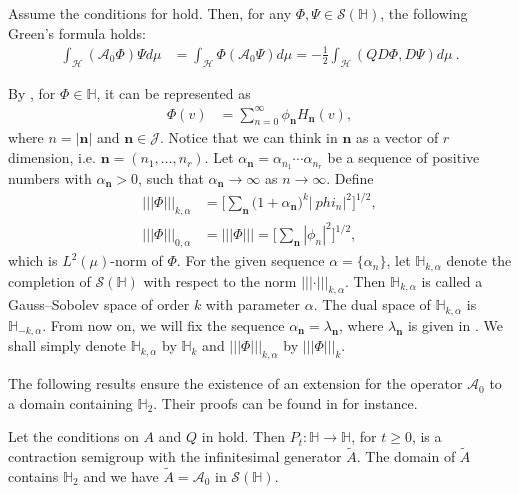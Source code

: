 \documentclass[review, onefignum, onetabnum]{siamart171218}
\begin{document}
\begin{lemma}
    Assume the conditions for   hold. Then, for any
    $\Phi,\Psi\in \mathcal{S}(\mathbb{H})$, the following Green’s formula holds:
    \begin{align}
         \int_{\mathcal{H}} (\mathcal{A}_0 \Phi)\Psi d\mu &=
             \int_{\mathcal{H}} \Phi(\mathcal{A}_0 \Psi) d\mu=
            -\frac{1}{2}\int_{\mathcal{H}} (QD\Phi, D\Psi) d\mu \ .
    \end{align}

\end{lemma}
By , for $\Phi \in \mathbb{H}$, it can be represented as
\begin{align} \label{s1.4}
    \Phi(v) &=
        \sum_{n=0}^\infty \phi_{\mathbf{n}} H_{\mathbf{n}}(v),
\end{align}
where $n = |\mathbf{n}|$ and $\mathbf{n}\in \mathcal{J}$. Notice that we can
think in $\mathbf{n}$ as a vector of $r$ dimension, i.e.
$\mathbf{n}=(n_1,\ldots,n_r)$.
Let $\alpha_{\mathbf{n}} = \alpha_{n_1}\cdots \alpha_{n_r}$ be a sequence of
positive numbers with $\alpha_{\mathbf{n}} > 0$, such that
$\alpha_{\mathbf{n}} \rightarrow \infty$ as $n \rightarrow \infty$.
Define
\begin{align*}
     |||\Phi|||_{k,\alpha} 
        &= \Bigg[ \sum_{\mathbf{n}}
        \big(
            1 + \alpha_{\mathbf{n}}
        \big) ^ k |\ phi_n |^2 \Bigg]^{1/2} ,
    \\
    |||\Phi|||_{0,\alpha} 
        &= |||\Phi|||=\Bigg[ \sum_{\mathbf{n}} |\phi_n|^2
    \Bigg]^{1/2},
\end{align*}
which is $L^2(\mu)$-norm of $\Phi$. For the given sequence
$\alpha = \{\alpha_n \}$, let $\mathbb{H}_{k,\alpha}$ denote
the completion of $\mathcal{S}(\mathbb{H})$ with respect to the norm
$|||\cdot|||_{k,\alpha}$. Then $\mathbb{H}_{k,\alpha}$ is called
a Gauss–Sobolev space of order $k$ with parameter $\alpha$. The dual space of
$\mathbb{H}_{k,\alpha}$ is $\mathbb{H}_{-k,\alpha}$.
From now on, we will fix the sequence $\alpha_{\mathbf{n}} =
\lambda_{\mathbf{n}} $, where $\lambda_{\mathbf{n}} $ is given in
.
We shall simply denote $\mathbb{H}_{k,\alpha}$ by $\mathbb{H}_{k}$ and
$ |||\Phi|||_{k,\alpha}$ by $|||\Phi|||_{k}$.

The following results ensure the existence of an extension for the operator
$\mathcal{A}_0$ to a domain containing $\mathbb{H}_{2}$. Their
proofs can be found in \cite{liu} for instance.

\begin{theorem}\label{the-Pt-A}
    Let the conditions on $A$ and $Q$ in  hold.
    Then \sloppy ${P_t: \mathbb{H}\rightarrow \mathbb{H}}$, for $t \ge 0$, is a
    contraction semigroup with the infinitesimal generator $\tilde{A}$.
    The domain of $\tilde{A}$ contains $\mathbb{H}_{2}$ and we have
    $\tilde{A} =\mathcal{A}_0 $ in $\mathcal{S}(\mathbb{H})$.

\end{theorem}
\end{document}
